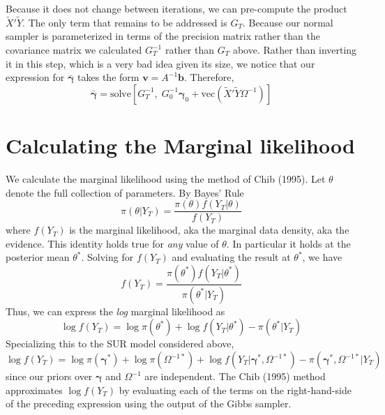 \documentclass[12pt]{article}
\begin{document}
Because it does not change between iterations, we can pre-compute the product $\widetilde{X}' \widetilde{Y}$.
The only term that remains to be addressed is $G_T$.
Because our normal sampler is parameterized in terms of the precision matrix rather than the covariance matrix we calculated $G_T^{-1}$ rather than $G_T$ above.
Rather than inverting it in this step, which is a very bad idea given its size, we notice that our expression for $\bar{\boldsymbol{\gamma}}$ takes the form $\mathbf{v}=A^{-1}\mathbf{b}$.
Therefore,
\begin{equation*}
\bar{\boldsymbol{\gamma}} = \mbox{solve}\left[ G_T^{-1}, \;  G_0^{-1}\boldsymbol{\gamma}_0 +\mbox{vec}\left( \widetilde{X}' \widetilde{Y} \Omega^{-1} \right)  \right]
\end{equation*}

\section{Calculating the Marginal likelihood}
We calculate the marginal likelihood using the method of Chib (1995).
Let $\theta$ denote the full collection of parameters.
By Bayes' Rule
\begin{equation*}
  \pi\left( \theta | Y_T \right) = \frac{\pi(\theta)f(Y_T|\theta)}{f(Y_T)}  
\end{equation*}
where $f(Y_T)$ is the marginal likelihood, aka the marginal data density, aka the evidence.
This identity holds true for \emph{any} value of $\theta$.
In particular it holds at the posterior mean $\theta^*$.
Solving for $f(Y_T)$ and evaluating the result at $\theta^*$, we have 
\begin{equation*}
  f\left(Y_T \right) = \frac{\pi(\theta^*)f(Y_T|\theta^*)}{\pi(\theta^*|Y_T)}  
\end{equation*}
Thus, we can express the \emph{log} marginal likelihood as
\begin{equation*}
  \log f(Y_T) = \log \pi(\theta^*) + \log f\left( Y_T|\theta^* \right) - \pi\left( \theta^*|Y_T \right)
\end{equation*}
Specializing this to the SUR model considered above,
\begin{equation*}
  \log f(Y_T) = \log \pi(\boldsymbol{\gamma}^*) + \log \pi\left( \Omega^{-1*} \right) + \log f\left( Y_T|\boldsymbol{\gamma}^*, \Omega^{-1*} \right) - \pi\left( \boldsymbol{\gamma}^*, \Omega^{-1*}|Y_T \right)
\end{equation*}
since our priors over $\boldsymbol{\gamma}$ and $\Omega^{-1}$ are independent.
The Chib (1995) method approximates $\log f(Y_T)$ by evaluating each of the terms on the right-hand-side of the preceding expression using the output of the Gibbs sampler.
\end{document}
